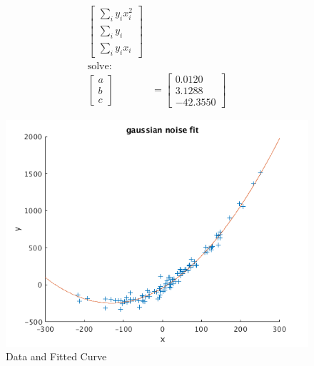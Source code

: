 \documentclass[12pt,letter]{article}
\begin{document}
\begin{enumerate}
\begin{enumerate}
\begin{align*}
\begin{bmatrix}
      \sum_i y_i x_i^2\\
      \sum_i y_i\\
      \sum_i y_i x_i
    \end{bmatrix}\\
    \text{solve: }\\
    \begin{bmatrix}
      a \\ b \\ c
    \end{bmatrix}
    &=
    \begin{bmatrix}
      0.0120\\
      3.1288\\
      -42.3550
    \end{bmatrix}
  \end{align*}
  
\begin{figure}[H]
\centering
\includegraphics[width=13cm]{imgs/q8_a.png}
 \caption{Data and Fitted Curve}
\label{label}
\end{figure}

\pagebreak


\end{enumerate}
\end{enumerate}
\end{document}
